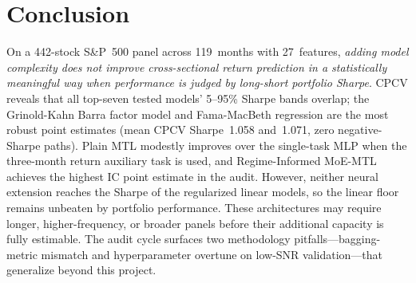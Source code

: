 \documentclass[11pt]{article}
\begin{document}
\section{Conclusion}\label{sec:conclusion}

On a 442-stock S\&P~500 panel across 119~months with 27~features,
\emph{adding model complexity does not improve cross-sectional return
prediction in a statistically meaningful way when performance is judged
by long-short portfolio Sharpe}. CPCV reveals that all top-seven tested
models' 5--95\% Sharpe bands overlap; the Grinold-Kahn Barra factor
model and Fama-MacBeth regression are the most robust point estimates
(mean CPCV Sharpe~1.058 and~1.071, zero negative-Sharpe paths). Plain
MTL modestly improves over the single-task MLP when the three-month
return auxiliary task is used, and Regime-Informed MoE-MTL achieves the
highest IC point estimate in the audit. However, neither neural
extension reaches the Sharpe of the regularized linear models, so the
linear floor remains unbeaten by portfolio performance. These
architectures may require longer, higher-frequency, or broader panels
before their additional capacity is fully estimable. The audit cycle
surfaces two methodology pitfalls---bagging-metric mismatch and
hyperparameter overtune on low-SNR validation---that generalize beyond
this project.
\end{document}
